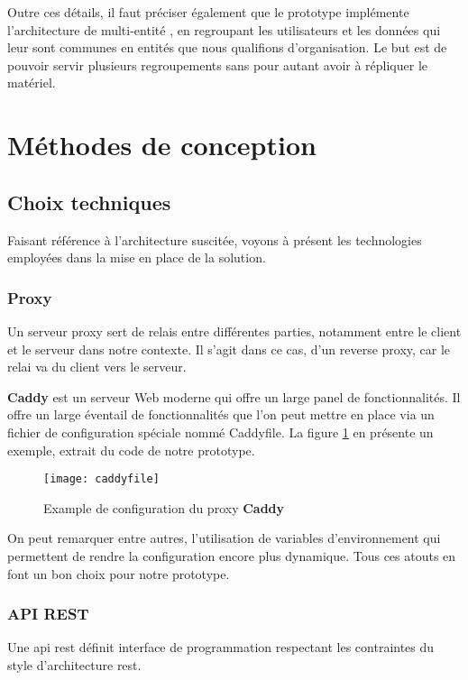 Outre ces détails, il faut préciser également que le prototype implémente l’architecture de multi-entité \cite{multitenancy}, 
en regroupant les utilisateurs et les données qui leur sont communes en entités que nous qualifions d’organisation. 
Le but est de pouvoir servir plusieurs regroupements sans pour autant avoir à répliquer le matériel. 

\section{Méthodes de conception}
\subsection{Choix techniques}
Faisant référence à l’architecture suscitée, 
voyons à présent les technologies employées dans la mise en place de la solution.

\subsubsection{Proxy}
Un serveur proxy sert de relais entre différentes parties, notamment entre le client et le serveur dans notre contexte. 
Il s’agit dans ce cas, d’un reverse proxy, car le relai va du client vers le serveur.
 
\textbf{Caddy} est un serveur Web moderne qui offre un large panel de fonctionnalités. 
Il offre un large éventail de fonctionnalités que l’on peut mettre en place via un fichier de configuration spéciale nommé Caddyfile. 
La figure \ref{fig:caddyfile} en présente un exemple, extrait du code de notre prototype.


\begin{figure}[h]
  \centering
  \texttt{[image: caddyfile]}
  \caption{Example de configuration du proxy \textbf{Caddy}}
  \label{fig:caddyfile}
\end{figure}

On peut remarquer entre autres, l’utilisation de variables d’environnement qui permettent de rendre la configuration encore plus dynamique. 
Tous ces atouts en font un bon choix pour notre prototype.

\subsubsection{API REST}

Une \acrshort{api} \acrshort{rest} définit interface de programmation respectant les contraintes du style d’architecture \acrlong{rest}.

